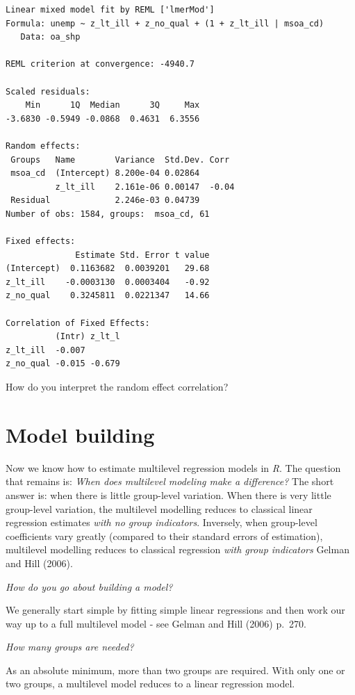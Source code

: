 \documentclass[
  letterpaper,
  DIV=11,
  numbers=noendperiod,
  oneside]{scrreprt}
\begin{document}
\begin{verbatim}
Linear mixed model fit by REML ['lmerMod']
Formula: unemp ~ z_lt_ill + z_no_qual + (1 + z_lt_ill | msoa_cd)
   Data: oa_shp

REML criterion at convergence: -4940.7

Scaled residuals: 
    Min      1Q  Median      3Q     Max 
-3.6830 -0.5949 -0.0868  0.4631  6.3556 

Random effects:
 Groups   Name        Variance  Std.Dev. Corr 
 msoa_cd  (Intercept) 8.200e-04 0.02864       
          z_lt_ill    2.161e-06 0.00147  -0.04
 Residual             2.246e-03 0.04739       
Number of obs: 1584, groups:  msoa_cd, 61

Fixed effects:
              Estimate Std. Error t value
(Intercept)  0.1163682  0.0039201   29.68
z_lt_ill    -0.0003130  0.0003404   -0.92
z_no_qual    0.3245811  0.0221347   14.66

Correlation of Fixed Effects:
          (Intr) z_lt_l
z_lt_ill  -0.007       
z_no_qual -0.015 -0.679
\end{verbatim}

How do you interpret the random effect correlation?

\section{Model building}\label{model-building}

Now we know how to estimate multilevel regression models in \emph{R}.
The question that remains is: \emph{When does multilevel modeling make a
difference?} The short answer is: when there is little group-level
variation. When there is very little group-level variation, the
multilevel modelling reduces to classical linear regression estimates
\emph{with no group indicators}. Inversely, when group-level
coefficients vary greatly (compared to their standard errors of
estimation), multilevel modelling reduces to classical regression
\emph{with group indicators} Gelman and Hill (2006).

\emph{How do you go about building a model?}

We generally start simple by fitting simple linear regressions and then
work our way up to a full multilevel model - see Gelman and Hill (2006)
p.~270.

\emph{How many groups are needed?}

As an absolute minimum, more than two groups are required. With only one
or two groups, a multilevel model reduces to a linear regression model.
\end{document}
